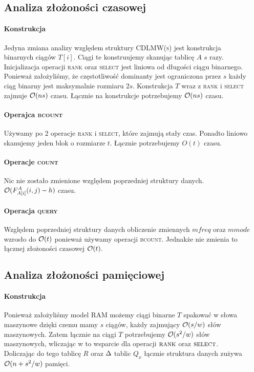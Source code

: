 \subsection{Analiza złożoności czasowej}
\paragraph{Konstrukcja} Jedyna zmiana analizy względem struktury \textsc{CDLMW(s)} jest konstrukcja binarnych ciągów $T[i]$. Ciągi te konstruujemy skanując tablicę $A$ $s$ razy. Inicjalizacja operacji \textsc{rank} oraz \textsc{select} jest liniowa od długości ciągu binarnego. Ponieważ założyliśmy, że częstotliwość dominanty jest ograniczona przez $s$ każdy ciąg binarny jest maksymalnie rozmiaru $2s$.
Konstrukcja $T$ wraz z \textsc{rank} i \textsc{select} zajmuje $\mathcal{O}(ns)$ czasu. Łącznie na konstrukcje potrzebujemy $\mathcal{O}(ns)$ czasu.
\paragraph{Operajca \textsc{bcount}} Używamy po 2 operacje \textsc{rank} i \textsc{select}, które zajmują stały czas. Ponadto liniowo skanujemy jeden blok o rozmiarze $t$. Łącznie potrzebujemy $O(t)$ czasu.
\paragraph{Operacje \textsc{count}} Nic nie zostało zmienione względem poprzedniej struktury danych. $\mathcal{O}(F^A_{A[i]}(i, j) - h)$ czasu.
\paragraph{Operacja \textsc{query}} Względem poprzedniej struktury danych obliczenie zmiennych $mfreq$ oraz $mmode$ wzrosło do $\mathcal{O}(t)$ ponieważ używamy operacji \textsc{bcount}. Jednakże nie zmienia to łącznej złożoności czasowej $\mathcal{O}(t)$.

\subsection{Analiza złożoności pamięciowej}
\paragraph{Konstrukcja} Ponieważ założyliśmy model \textsc{RAM} możemy ciągi binarne $T$ spakować w słowa maszynowe dzięki czemu mamy $s$ ciągów, każdy zajmujący $\mathcal{O}(s/w)$ słów maszynowych. Zatem łącznie na ciągi $T$ potrzebujemy $\mathcal{O}(s^2/w)$ słów maszynowych, wliczając w to wsparcie dla operacji $\textsc{rank}$ oraz $\textsc{select}$. Doliczając do tego tablicę $R$ oraz $\Delta$ tablic $Q_x$ łącznie struktura danych zużywa $\mathcal{O}(n + s^2/w)$ pamięci.
